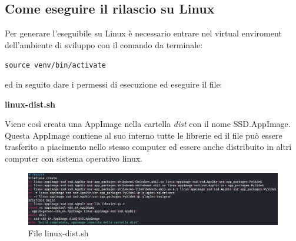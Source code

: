 \subsection{Come eseguire il rilascio su Linux}
Per generare l'eseguibile su Linux è necessario entrare nel virtual enviroment dell'ambiente di sviluppo con il comando da terminale:
\newline{}\centerline{\texttt{source venv/bin/activate}}\newline{}
ed in seguito dare i permessi di esecuzione ed eseguire il file:
\newline{}\centerline{\textbf{linux-dist.sh}}\newline{}
Viene così creata una AppImage nella cartella \textit{dist} con il nome SSD.AppImage. \\
Questa AppImage contiene al suo interno tutte le librerie ed il file può essere trasferito a piacimento nello stesso computer ed essere anche distribuito in altri computer con sistema operativo linux.
\begin{figure}[H]
    \centering
    \includegraphics[scale = 0.2]{components/img/linux-deploy-script.png}
    \caption{File linux-dist.sh}
    \label{fig:File win-dist.bat}
\end{figure}

